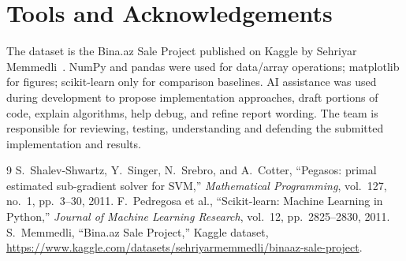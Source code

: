 \documentclass[10pt,twocolumn,a4paper]{article}
\begin{document}
\section*{Tools and Acknowledgements}
The dataset is the Bina.az Sale Project published on Kaggle by Sehriyar Memmedli~\cite{dataset}. NumPy and pandas were used for data/array operations; matplotlib for figures; scikit-learn only for comparison baselines. AI assistance was used during development to propose implementation approaches, draft portions of code, explain algorithms, help debug, and refine report wording. The team is responsible for reviewing, testing, understanding and defending the submitted implementation and results.

\begin{thebibliography}{9}
S.~Shalev-Shwartz, Y.~Singer, N.~Srebro, and A.~Cotter,
``Pegasos: primal estimated sub-gradient solver for SVM,''
\emph{Mathematical Programming}, vol.~127, no.~1, pp.~3--30, 2011.
F.~Pedregosa et al., ``Scikit-learn: Machine Learning in Python,''
\emph{Journal of Machine Learning Research}, vol.~12, pp.~2825--2830, 2011.
S.~Memmedli, ``Bina.az Sale Project,'' Kaggle dataset,\newline
\url{https://www.kaggle.com/datasets/sehriyarmemmedli/binaaz-sale-project}.
\end{thebibliography}
\end{document}
